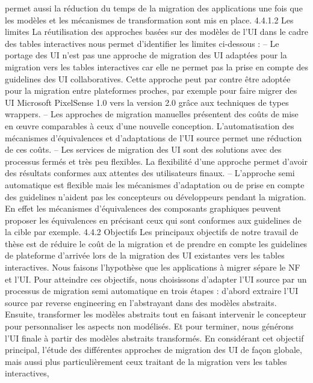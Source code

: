 \documentclass{article}
\begin{document}
permet aussi la r\'{e}duction du temps de la migration des applications une fois que les mod\`{e}les et
les m\'{e}canismes de transformation sont mis en place.
4.4.1.2
Les limites
La r\'{e}utilisation des approches bas\'{e}es sur des mod\`{e}les de l’UI dans le cadre des tables interactives
nous permet d’identiﬁer les limites ci-dessous :
– Le portage des UI n’est pas une approche de migration des UI adapt\'{e}es pour la migration
vers les tables interactives car elle ne permet pas la prise en compte des guidelines des UI
collaboratives. Cette approche peut par contre \^{e}tre adopt\'{e}e pour la migration entre plateformes
proches, par exemple pour faire migrer des UI Microsoft PixelSense 1.0 vers la version 2.0
gr\^{a}ce aux techniques de types wrappers.
– Les approches de migration manuelles pr\'{e}sentent des co\^{u}ts de mise en œuvre comparables \`{a}
ceux d’une nouvelle conception. L’automatisation des m\'{e}canismes d’\'{e}quivalences et d’adaptations de l’UI source permet une r\'{e}duction de ces co\^{u}ts.
– Les services de migration des UI sont des solutions avec des processus ferm\'{e}s et tr\`{e}s peu
ﬂexibles. La ﬂexibilit\'{e} d’une approche permet d’avoir des r\'{e}sultats conformes aux attentes des
utilisateurs ﬁnaux.
– L’approche semi automatique est ﬂexible mais les m\'{e}canismes d’adaptation ou de prise en
compte des guidelines n’aident pas les concepteurs ou d\'{e}veloppeurs pendant la migration. En
effet les m\'{e}canismes d’\'{e}quivalences des composants graphiques peuvent proposer les \'{e}quivalences en pr\'{e}cisant ceux qui sont conformes aux guidelines de la cible par exemple.
4.4.2
Objectifs
Les principaux objectifs de notre travail de th\`{e}se est de r\'{e}duire le co\^{u}t de la migration et de
prendre en compte les guidelines de plateforme d’arriv\'{e}e lors de la migration des UI existantes vers
les tables interactives. Nous faisons l’hypoth\`{e}se que les applications \`{a} migrer s\'{e}pare le NF et l’UI.
Pour atteindre ces objectifs, nous choisissons d’adapter l’UI source par un processus de migration
semi automatique en trois \'{e}tapes : d’abord extraire l’UI source par reverse engineering en l’abstrayant
dans des mod\`{e}les abstraits. Ensuite, transformer les mod\`{e}les abstraits tout en faisant intervenir le
concepteur pour personnaliser les aspects non mod\'{e}lis\'{e}s. Et pour terminer, nous g\'{e}n\'{e}rons l’UI ﬁnale
\`{a} partir des mod\`{e}les abstraits transform\'{e}s.
En consid\'{e}rant cet objectif principal, l’\'{e}tude des diff\'{e}rentes approches de migration des UI de
fa\c{c}on globale, mais aussi plus particuli\`{e}rement ceux traitant de la migration vers les tables interactives,
\end{document}
